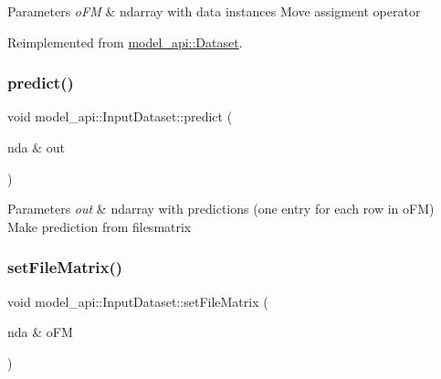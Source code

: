 \begin{DoxyParams}{Parameters}
{\em o\+FM} & ndarray with data instances Move assigment operator \\
\hline
\end{DoxyParams}


Reimplemented from \hyperlink{classmodel__api_1_1Dataset_a48ed0afad3bae183a4615a4de9dba854}{model\+\_\+api\+::\+Dataset}.

\mbox{\label{classmodel__api_1_1InputDataset_af25824b44f866ff2b03e5d1036d7215a}} 
\subsubsection{\texorpdfstring{predict()}{predict()}}
{\footnotesize\ttfamily void model\+\_\+api\+::\+Input\+Dataset\+::predict (\begin{DoxyParamCaption}\item[{nda \&}]{out }\end{DoxyParamCaption})}


\begin{DoxyParams}{Parameters}
{\em out} & ndarray with predictions (one entry for each row in o\+FM) Make prediction from filesmatrix \\
\hline
\end{DoxyParams}
\mbox{\label{classmodel__api_1_1InputDataset_a71111535a17422db1f0fdbe2ac6ce1c8}} 
\subsubsection{\texorpdfstring{set\+File\+Matrix()}{setFileMatrix()}}
{\footnotesize\ttfamily void model\+\_\+api\+::\+Input\+Dataset\+::set\+File\+Matrix (\begin{DoxyParamCaption}\item[{nda \&}]{o\+FM }\end{DoxyParamCaption})\hspace{0.3cm}{\ttfamily [virtual]}}


